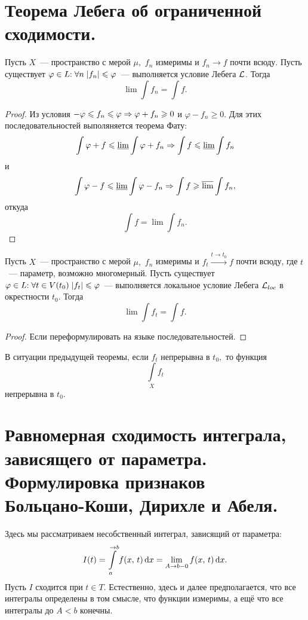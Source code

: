 \documentclass{notes}
\begin{document}
\section{Теорема Лебега об ограниченной сходимости.}

	\begin{thm}
		Пусть $X$~--- пространство с мерой $\mu,$ $f_n$ измеримы и $f_n \to f$ почти всюду. Пусть существует $\varphi\in L\text{\text{:}} \; \forall n \; |f_n| \leqslant \varphi$~--- выполняется условие Лебега $\mathcal{L}$. Тогда
		\[
			\lim \int f_n = \int f.
		\]
		\begin{proof}
			Из условия $-\varphi \leqslant f_n \leqslant \varphi \Rightarrow \varphi + f_n  \geqslant 0$ и $\varphi - f_n \geqslant 0$. Для этих последовательностей выполяняется теорема Фату:
			\[
				\int \varphi + f \leqslant \underline{\lim} \int \varphi + f_n \Rightarrow \int f \leqslant \underline{\lim} \int f_n
			\]
			и
			\[
				\int \varphi - f \leqslant \underline{\lim} \int \varphi - f_n \Rightarrow \int f \geqslant \overline{\lim} \int f_n,
			\]
			откуда
			\[
				\int f = \lim \int f_n.
			\]
		\end{proof}
	\end{thm}

	\begin{cor}
		Пусть $X$~--- пространство с мерой $\mu,$ $f_n$ измеримы и $f_t \xrightarrow{t \to t_0} f$ почти всюду, где $t$~--- параметр, возможно многомерный. Пусть существует $\varphi\in L\text{\text{:}} \; \forall t \in V(t_0) \; |f_t| \leqslant \varphi$~--- выполняется локальное условие Лебега $\mathcal{L}_{loc}$ в окрестности $t_0$. Тогда
		\[
			\lim \int f_t = \int f.
		\]
		\begin{proof}
			Если переформулировать на языке последовательностей.
		\end{proof}
	\end{cor}

	\begin{cor}
		В ситуации предыдущей теоремы, если $f_t$ непрерывна в $t_0,$ то функция
		\[
			\int\limits_X f_t
		\]
		непрерывна в $t_0$.
	\end{cor}

\section{Равномерная сходимость интеграла, \\ зависящего от параметра. Формулировка признаков \\ Больцано-Коши, Дирихле и Абеля.}

	Здесь мы рассматриваем несобственный интеграл, зависящий от параметра:
	\[
		I(t) = \int\limits_{a}^{\to b} f(x, \, t) \, \mathrm{d} x = \lim \limits_{A \to b-0} f(x, \, t) \, \mathrm{d} x.
	\]
	Пусть $I$ сходится при $t \in T$. Естественно, здесь и далее предполагается, что все интегралы определены в том смысле, что функции измеримы, а ещё что все интегралы до $A < b$ конечны.
\end{document}
